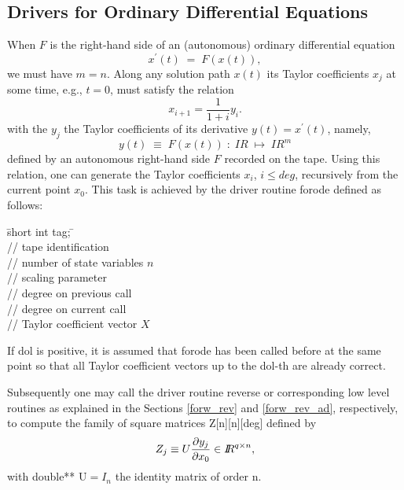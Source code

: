 \documentclass[11pt,twoside]{article}
\begin{document}
\subsection{Drivers for Ordinary Differential Equations}
\label{odedrivers}
%
When $F$ is the right-hand side of an (autonomous) ordinary
differential equation  
\[
x^\prime(t) \; = \; F(x(t)) ,  
\] 
we must have $m=n$. Along any solution path $x(t)$ its Taylor
coefficients $x_j$ at some time, e.g., $t=0$, must satisfy
the relation 
\[
 x_{i+1} = \frac{1}{1+i} y_i. 
\]
with the $y_j$ the Taylor coefficients of its derivative $y(t)=x^\prime(t)$, namely, 
\[
 y(t) \; \equiv \; F(x(t)) \; : \;  I\!\!R \;\mapsto \;I\!\!R^m 
\]
defined by an autonomous right-hand side $F$ recorded on the tape.
Using this relation, one can generate the Taylor coefficients $x_i$,
$i \le deg$,
recursively from the current point $x_0$. This task is achieved by the
driver routine {\sf forode} defined as follows:
%
\begin{tabbing}
\hspace{0.5in}\={\sf short int tag;} \hspace{1.1in}\= \kill    %
\\
         \> // tape identification \\
                 \> // number of state variables $n$\\
            \> // scaling parameter\\
               \> // degree on previous call\\
               \> // degree on current call\\
    \> // Taylor coefficient vector $X$
\end{tabbing}
%
If {\sf dol} is positive, it is assumed that {\sf forode}
has been called before at the same point so that all Taylor coefficient
vectors up to the {\sf dol}-th are already correct. 

Subsequently one may call the driver routine {\sf reverse} or corresponding
low level routines as explained in the Sections \ref{forw_rev} and
\ref{forw_rev_ad}, respectively, to compute
the family of square matrices {\sf Z[n][n][deg]} defined by
\[
Z_j \equiv U\/\frac{\partial y_j}{\partial x_0} \in{I\!\!R}^{q \times n} ,
\]
with {\sf double** U}$=I_n$ the identity matrix of order {\sf n}. 
\end{document}
